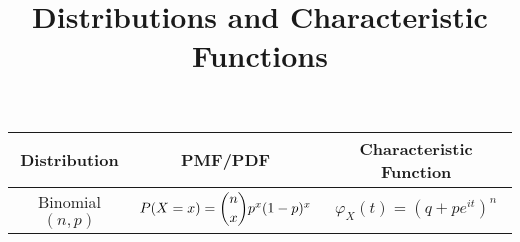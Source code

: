 \documentclass[11pt, a4paper]{article}
\title{\textbf{Distributions and Characteristic Functions}}
\author{}
\date{}
\begin{document}
\maketitle

\begin{center}

\def\arraystretch{1.5}
\setlength{\tabcolsep}{12pt}
	
\begin{longtable}{|c|c|c|}

\hline

Distribution & PMF/PDF & Characteristic Function \\

\hline

\hline

Binomial$(n, p)$ & $P(X = x) = {\dbinom{n}{x}} p^x (1-p)^x $ & $\varphi_{X} (t) = (q + pe^{it})^n $



\end{longtable}
\end{center}
\end{document}

